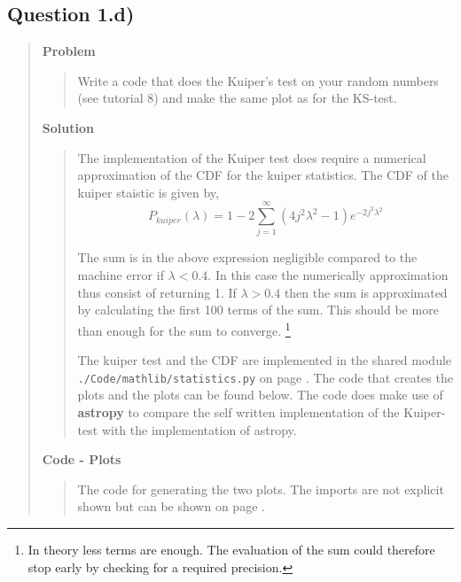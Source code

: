 \subsection*{\textbf{Question 1.d)}}
\begin{quote}

\textbf{Problem}
\begin{quote}
Write a code that does the Kuiper’s test on your random numbers (see tutorial
8) and make the same plot as for the KS-test.
\end{quote}

\textbf{Solution} 
\begin{quote}
The implementation of the Kuiper test does require a numerical approximation of the CDF for the kuiper statistics. The CDF of the kuiper staistic is given by, 
\begin{equation}
P_{kuiper}( \lambda) =  1 - 2  \sum_{j=1}^{\infty} (4j^2 \lambda^2-1) e^{-2j^2 \lambda^2 }
\end{equation}

The sum is in the above expression negligible compared to the machine error if $\lambda < 0.4$. In this case the numerically approximation thus consist of returning 1.  If $\lambda > 0.4$ then the sum is approximated by calculating the first 100 terms of the sum. This should be more than enough for the sum to converge. \footnote{In theory less terms are enough. The evaluation of the sum could therefore stop early by checking for a required precision. } 

The kuiper test and the CDF are implemented in the shared module \texttt{./Code/mathlib/statistics.py} on page \pageref{CODE:Statistics}. The code that creates the plots and the plots can be found below.  The code does make use of \textbf{astropy} to compare the self written implementation of the Kuiper-test with the implementation of astropy. 
\end{quote}

\textbf{Code - Plots}

\begin{quote}
The code for generating the two plots. The imports are not explicit shown but can be shown on page \pageref{CODE:MAIN1}. 

\end{quote}


\end{quote}
